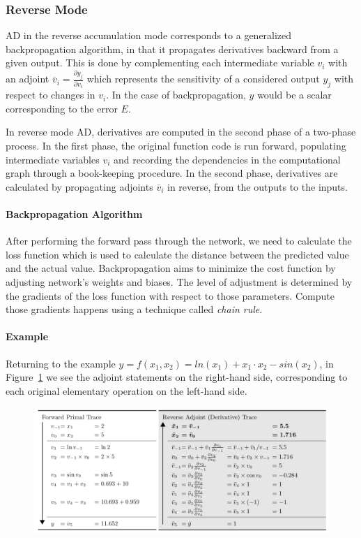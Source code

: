 \subsubsection{Reverse Mode}
AD in the reverse accumulation mode corresponds to a generalized backpropagation algorithm, in that it propagates derivatives backward from a given output. This is done by complementing each intermediate variable $v_i$ with an adjoint $\overline{v}_i=\frac{\partial y_j}{\partial v_i}$ which represents the sensitivity of a considered output $y_j$ with respect to changes in $v_i$. In the case of backpropagation, $y$ would be a scalar corresponding to the error $E$.

In reverse mode AD, derivatives are computed in the second phase of a two-phase process. In the first phase, the original function code is run forward, populating intermediate variables $v_i$ and recording the dependencies in the computational graph through a book-keeping procedure. In the second phase, derivatives are calculated by propagating adjoints
$\overline{v}_i$ in reverse, from the outputs to the inputs.

\paragraph{Backpropagation Algorithm}
After performing the forward pass through the network, we need to calculate the loss function which is used to calculate the distance between the predicted value and the actual value. Backpropagation aims to minimize the cost function by adjusting network’s weights and biases. The level of adjustment is determined by the gradients of the loss function with respect to those parameters. Compute those gradients happens using a technique called \emph{chain rule}.

\paragraph{Example}
Returning to the example $y=f(x_1,x_2)= ln(x_1)+ x_1 \cdot x_2 -sin(x_2)$, in Figure~\ref{revMode}  we see the adjoint statements on the right-hand side, corresponding to each original elementary operation on the left-hand side.

\begin{figure}[h!]
	\centering \includegraphics[scale=0.47]{img/revMode}
	\caption{}
	\label{revMode}
\end{figure}

